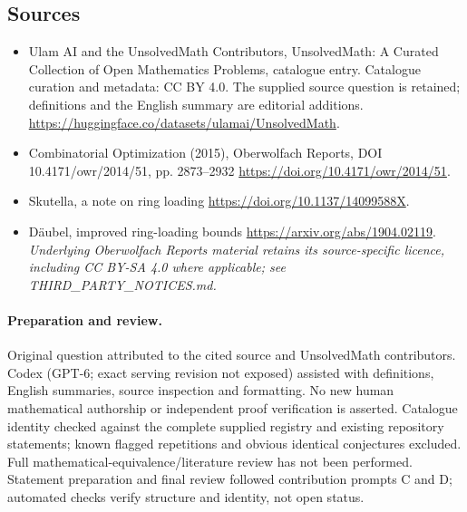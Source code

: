 \documentclass[11pt]{article}
\begin{document}
\subsection{Sources}
\begin{itemize}
\item[\hypertarget{source:statement:1}{S1}] Ulam AI and the UnsolvedMath Contributors, UnsolvedMath: A Curated Collection of Open Mathematics Problems, catalogue entry. Catalogue curation and metadata: CC BY 4.0. The supplied source question is retained; definitions and the English summary are editorial additions.
\url{https://huggingface.co/datasets/ulamai/UnsolvedMath}.
\item[\hypertarget{source:statement:2}{S2}] Combinatorial Optimization (2015), Oberwolfach Reports, DOI 10.4171/owr/2014/51, pp. 2873--2932
\url{https://doi.org/10.4171/owr/2014/51}.
\item[\hypertarget{source:statement:3}{S3}] Skutella, a note on ring loading
\url{https://doi.org/10.1137/14099588X}.
\item[\hypertarget{source:statement:4}{S4}] Däubel, improved ring-loading bounds
\url{https://arxiv.org/abs/1904.02119}.
\textit{Underlying Oberwolfach Reports material retains its source-specific licence, including CC BY-SA 4.0 where applicable; see THIRD\_PARTY\_NOTICES.md.}
\end{itemize}
\paragraph{Preparation and review.}
Original question attributed to the cited source and UnsolvedMath contributors. Codex (GPT-6; exact serving revision not exposed) assisted with definitions, English summaries, source inspection and formatting. No new human mathematical authorship or independent proof verification is asserted. Catalogue identity checked against the complete supplied registry and existing repository statements; known flagged repetitions and obvious identical conjectures excluded. Full mathematical-equivalence/literature review has not been performed. Statement preparation and final review followed contribution prompts C and D; automated checks verify structure and identity, not open status.
\label{end:statement}
\end{document}
